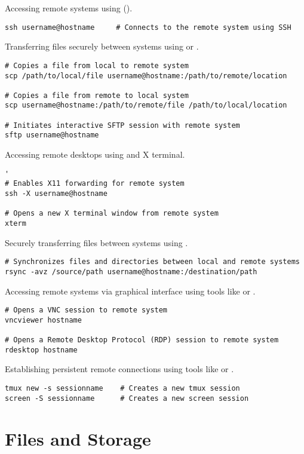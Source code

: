 Accessing remote systems using  ().
\begin{lstlisting}
ssh username@hostname     # Connects to the remote system using SSH
\end{lstlisting}

Transferring files securely between systems using  or .
\begin{lstlisting}
# Copies a file from local to remote system
scp /path/to/local/file username@hostname:/path/to/remote/location

# Copies a file from remote to local system
scp username@hostname:/path/to/remote/file /path/to/local/location

# Initiates interactive SFTP session with remote system
sftp username@hostname    
\end{lstlisting}

Accessing remote desktops using  and X terminal.
\begin{lstlisting}'
# Enables X11 forwarding for remote system
ssh -X username@hostname

# Opens a new X terminal window from remote system
xterm        
\end{lstlisting}

Securely transferring files between systems using .
\begin{lstlisting}
# Synchronizes files and directories between local and remote systems
rsync -avz /source/path username@hostname:/destination/path
\end{lstlisting}

Accessing remote systems via graphical interface using tools like  or .
\begin{lstlisting}
# Opens a VNC session to remote system
vncviewer hostname

# Opens a Remote Desktop Protocol (RDP) session to remote system
rdesktop hostname
\end{lstlisting}

Establishing persistent remote connections using tools like  or .
\begin{lstlisting}
tmux new -s sessionname    # Creates a new tmux session
screen -S sessionname      # Creates a new screen session
\end{lstlisting}








\section{Files and Storage}

